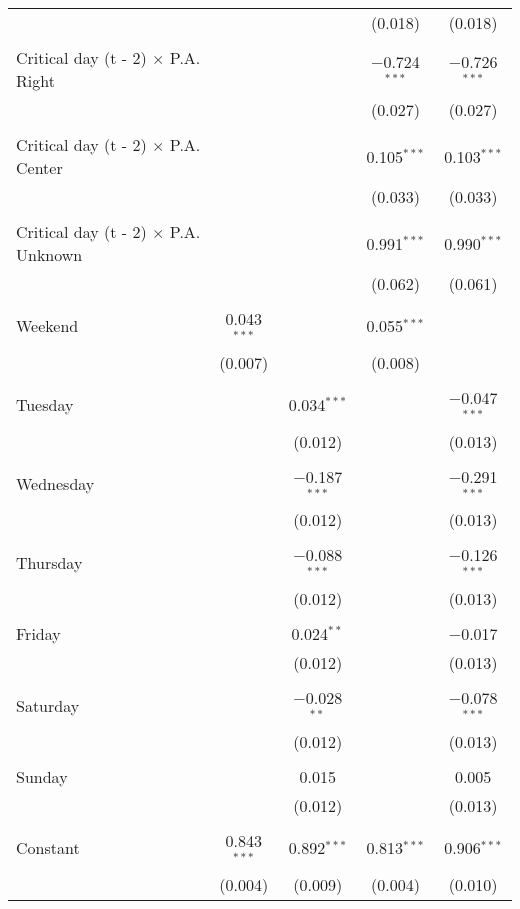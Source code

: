 \documentclass[
]{article}
\begin{document}
\begin{table}[!htbp]
{\begin{tabular}{@{\extracolsep{5pt}}lcccc}
  &  &  & (0.018) & (0.018) \\ 
  & & & & \\ 
 Critical day (t - 2) $\times$ P.A. Right &  &  & $-$0.724$^{***}$ & $-$0.726$^{***}$ \\ 
  &  &  & (0.027) & (0.027) \\ 
  & & & & \\ 
 Critical day (t - 2) $\times$ P.A. Center &  &  & 0.105$^{***}$ & 0.103$^{***}$ \\ 
  &  &  & (0.033) & (0.033) \\ 
  & & & & \\ 
 Critical day (t - 2) $\times$ P.A. Unknown &  &  & 0.991$^{***}$ & 0.990$^{***}$ \\ 
  &  &  & (0.062) & (0.061) \\ 
  & & & & \\ 
 Weekend & 0.043$^{***}$ &  & 0.055$^{***}$ &  \\ 
  & (0.007) &  & (0.008) &  \\ 
  & & & & \\ 
 Tuesday &  & 0.034$^{***}$ &  & $-$0.047$^{***}$ \\ 
  &  & (0.012) &  & (0.013) \\ 
  & & & & \\ 
 Wednesday &  & $-$0.187$^{***}$ &  & $-$0.291$^{***}$ \\ 
  &  & (0.012) &  & (0.013) \\ 
  & & & & \\ 
 Thursday &  & $-$0.088$^{***}$ &  & $-$0.126$^{***}$ \\ 
  &  & (0.012) &  & (0.013) \\ 
  & & & & \\ 
 Friday &  & 0.024$^{**}$ &  & $-$0.017 \\ 
  &  & (0.012) &  & (0.013) \\ 
  & & & & \\ 
 Saturday &  & $-$0.028$^{**}$ &  & $-$0.078$^{***}$ \\ 
  &  & (0.012) &  & (0.013) \\ 
  & & & & \\ 
 Sunday &  & 0.015 &  & 0.005 \\ 
  &  & (0.012) &  & (0.013) \\ 
  & & & & \\ 
 Constant & 0.843$^{***}$ & 0.892$^{***}$ & 0.813$^{***}$ & 0.906$^{***}$ \\ 
  & (0.004) & (0.009) & (0.004) & (0.010) \\ 

\end{tabular}}
\end{table}
\end{document}

